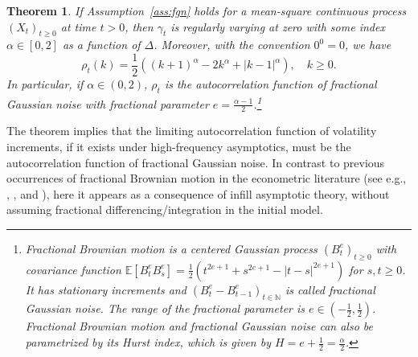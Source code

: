 \documentclass[ecta,nameyear,draft]{econsocart}
\newtheorem{theorem}{Theorem}[section]
\newcommand{\1}{\mathbf 1}
\def\E{\mathbb{E}}
\numberwithin{equation}{section}
\begin{document}
\begin{theorem}\label{thm:acf} If  Assumption~\ref{ass:fgn} holds for a   mean-square continuous process  $(X_t)_{t\geq0}$ at time $t>0$, then  $\gamma_t$ is  regularly varying   at zero with some index $\alpha\in[0,2]$ as a function of $\Delta$. Moreover, with the convention $0^0=0$, we have
\begin{equation}\label{eq:acf} 
	\rho_t(k)=\frac12((k+1)^\alpha-2k^\alpha+\lvert k-1\rvert^\alpha),\quad k\geq0.
\end{equation}
In particular, if $\alpha\in(0,2)$, $\rho_t$ is the autocorrelation function of fractional Gaussian noise with fractional parameter $e=\frac{\alpha-1}2$.\footnote{Fractional Brownian motion is a centered Gaussian process $(B^e_t)_{t\geq0}$ with covariance function $\E[B^e_tB^e_s]= \frac12(t^{2e+1}+s^{2e+1}-\lvert t-s\rvert^{2e+1})$ for $s,t\geq0$. It has stationary increments and $(B^e_t-B^e_{t-1})_{t\in\mathbb{N}}$ is called \emph{fractional Gaussian noise}. The range of the fractional parameter is $e\in(-\frac12,\frac12)$. Fractional Brownian motion and fractional Gaussian noise can also be parametrized by its Hurst index, which is given by $H=e+\frac12=\frac\alpha2$.}
\end{theorem}

The theorem implies that the limiting autocorrelation function of volatility increments, if it exists under  high-frequency asymptotics, must be the autocorrelation function of fractional Gaussian noise. In contrast to previous occurrences of fractional Brownian motion in the econometric literature (see e.g., \cite{S90}, \cite{L91}, \cite{CR96} and \cite{MW08}), here it appears as a consequence of infill asymptotic theory, without assuming fractional differencing/integration in the initial model.
\end{document}
